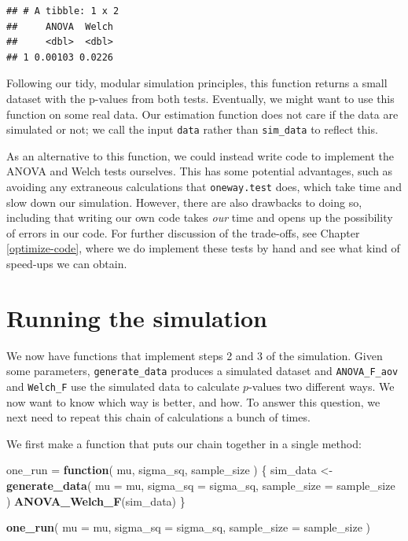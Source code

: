 \documentclass[
]{book}
\newenvironment{Shaded}{\begin{snugshade}}{\end{snugshade}}
\newcommand{\AttributeTok}[1]{\textcolor[rgb]{0.13,0.29,0.53}{#1}}
\newcommand{\ControlFlowTok}[1]{\textcolor[rgb]{0.13,0.29,0.53}{\textbf{#1}}}
\newcommand{\FunctionTok}[1]{\textcolor[rgb]{0.13,0.29,0.53}{\textbf{#1}}}
\newcommand{\NormalTok}[1]{#1}
\newcommand{\OtherTok}[1]{\textcolor[rgb]{0.56,0.35,0.01}{#1}}
\begin{document}
\begin{verbatim}
## # A tibble: 1 x 2
##     ANOVA  Welch
##     <dbl>  <dbl>
## 1 0.00103 0.0226
\end{verbatim}

Following our tidy, modular simulation principles, this function returns a small dataset with the p-values from both tests.
Eventually, we might want to use this function on some real data.
Our estimation function does not care if the data are simulated or not; we call the input \texttt{data} rather than \texttt{sim\_data} to reflect this.

As an alternative to this function, we could instead write code to implement the ANOVA and Welch tests ourselves.
This has some potential advantages, such as avoiding any extraneous calculations that \texttt{oneway.test} does, which take time and slow down our simulation.
However, there are also drawbacks to doing so, including that writing our own code takes \emph{our} time and opens up the possibility of errors in our code.
For further discussion of the trade-offs, see Chapter \ref{optimize-code}, where we do implement these tests by hand and see what kind of speed-ups we can obtain.

\section{Running the simulation}\label{running-the-simulation}

We now have functions that implement steps 2 and 3 of the simulation.
Given some parameters, \texttt{generate\_data} produces a simulated dataset and \texttt{ANOVA\_F\_aov} and \texttt{Welch\_F} use the simulated data to calculate \(p\)-values two different ways.
We now want to know which way is better, and how.
To answer this question, we next need to repeat this chain of calculations a bunch of times.

We first make a function that puts our chain together in a single method:

\begin{Shaded}
\begin{Highlighting}[]
\NormalTok{one\_run }\OtherTok{=} \ControlFlowTok{function}\NormalTok{( mu, sigma\_sq, sample\_size ) \{}
\NormalTok{  sim\_data }\OtherTok{\textless{}{-}} \FunctionTok{generate\_data}\NormalTok{(}
    \AttributeTok{mu =}\NormalTok{ mu, }
    \AttributeTok{sigma\_sq =}\NormalTok{ sigma\_sq,}
    \AttributeTok{sample\_size =}\NormalTok{ sample\_size}
\NormalTok{  )}
  \FunctionTok{ANOVA\_Welch\_F}\NormalTok{(sim\_data)}
\NormalTok{\}}

\FunctionTok{one\_run}\NormalTok{( }\AttributeTok{mu =}\NormalTok{ mu, }\AttributeTok{sigma\_sq =}\NormalTok{ sigma\_sq, }\AttributeTok{sample\_size =}\NormalTok{ sample\_size )}
\end{Highlighting}
\end{Shaded}
\end{document}
